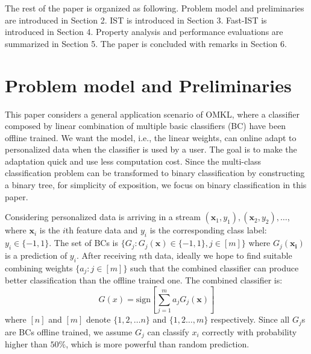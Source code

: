 \documentclass[letterpaper]{article}
\begin{document}
The rest of the paper is organized as following. Problem model and preliminaries are introduced in Section 2. IST is introduced in Section 3. Fast-IST is introduced in Section 4. Property analysis and performance evaluations are summarized in Section 5. The paper is concluded with remarks in Section 6.

\section{Problem model and Preliminaries}

This paper considers a general application scenario of OMKL, where a classifier composed by linear combination of multiple basic classifiers (BC) have been offline trained. We want the model, i.e., the linear weights, can online adapt to personalized data when the classifier is used by a user. %
The goal is to make the adaptation quick and use less computation cost. %
Since the multi-class classification problem can be transformed to binary classification by constructing a binary tree, for simplicity of exposition, we focus on binary classification in this paper.

Considering personalized data is arriving in a stream $(\mathbf{x}_1, y_1), (\mathbf{x}_2, y_2), \ldots$,  where $\mathbf{x}_i$  is the $i$th feature data and $y_i$ is the corresponding class label: $y_i \in \{-1, 1\}$. The set of BCs is $\{G_j : G_j(\mathbf{x}) \in \{-1, 1\}, j \in [m]\}$ where $G_j(\mathbf{x_i})$ is a prediction of $y_i$. After receiving $n$th data, ideally we hope to find suitable combining weights $\{a_j : j \in [m]\}$ such that the combined classifier can produce better classification than the offline trained one. The combined classifier is:
\begin{equation}
G(x) = \textrm{sign}\left[\sum_{j=1}^m a_jG_j(\mathbf{x})\right]
\label{eqn:model}
\end{equation}
where $[n]$ and $[m]$ denote $\{1, 2, \ldots n\}$ and $\{1, 2 \ldots, m\}$ respectively. %
Since all $G_j$s are BCs offline trained, we assume $G_j$ can classify $x_i$ correctly with probability higher than $50\%$, which is more powerful than random prediction.
\end{document}
